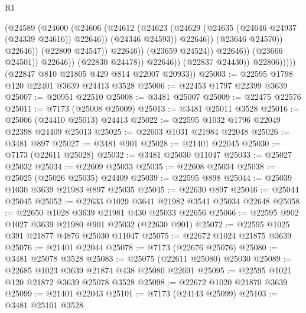\begin{lexlean}{R1}
\begin{coremodule}
                                            (@24589
                                              (@24600
                                                (@24606
                                                  (@24612
                                                    (@24623
                                                      (@24629
                                                        (@24635
                                                          (@24646 @24937 (@24339 @24616))
                                                          @22646))
                                                      (@24346 @24593))
                                                    @22646))
                                                (@23646 @24570))
                                              @22646))
                                          (@22809 @24547))
                                        @22646))
                                    (@23659 @24524))
                                  @22646))
                              (@23666 @24501))
                            @22646))
                        (@22830 @24478))
                      @22646))
                  (@22837 @24430))
                @22806)))))
      (@22847 @810 @21805 @429 @814 @22007 @20933))
@25003 := @22595 @1798 @120 @22401 @3639 @24413 @3528
@25006 := @22453 @1797 @22399 @3639
@25007 := @20951 @22510
@25008 := @3481 @25007
@25009 := @22475 @22576
@25011 := @7173 (@25008 @25009)
@25013 := @3481 @25011 @3528
@25016 := @25006 (@24410 @25013) @24413
@25022 := @22595 @1032 @1796 @22049 @22398 @24409 @25013
@25025 := @22603 @1031 @21984 @22048
@25026 := @3481 @897
@25027 := @3481 @901
@25028 := @21401 @22045
@25030 := @7173 (@22611 @25028)
@25032 := @3481 @25030 @11047
@25033 := @25027 @25032
@25034 := @22609 @25033
@25035 := @22608 @25034
@25038 := @25025 (@25026 @25035) @24409
@25039 := @22595 @898
@25044 := @25039 @1030 @3639 @21983 @897 @25035
@25045 := @22630 @897
@25046 := @25044 @25045
@25052 := @22633 @1029 @3641 @21982 @3541 @25034 @22648
@25058 := @22650 @1028 @3639 @21981 @430 @25033 @22656
@25066 := @22595 @902 @1027 @3639 @21980 @901 @25032 (@22630 @901)
@25072 := @22595 @1025 @391 @21877 @4876 @25030 @11047
@25075 := @22672 @1024 @21875 @3639
@25076 := @21401 @22044
@25078 := @7173 (@22676 @25076)
@25080 := @3481 @25078 @3528
@25083 := @25075 (@22611 @25080) @25030
@25089 := @22685 @1023 @3639 @21874 @438 @25080 @22691
@25095 := @22595 @1021 @120 @21872 @3639 @25078 @3528
@25098 := @22672 @1020 @21870 @3639
@25099 := @21401 @22043
@25101 := @7173 (@24143 @25099)
@25103 := @3481 @25101 @3528

\end{coremodule}
\end{lexlean}
